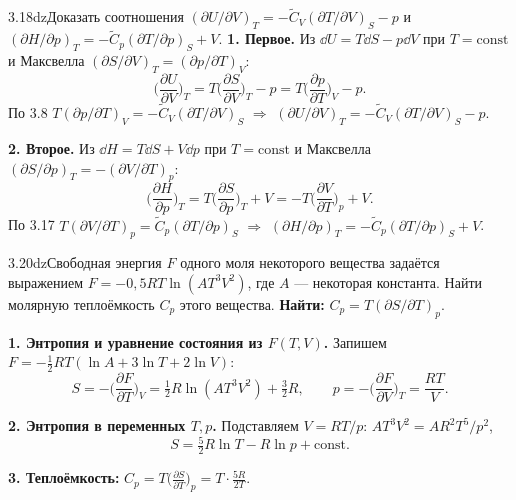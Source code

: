 \begin{problem}{3.18}{dz}{Доказать соотношения $(\partial U/\partial V)_T=-\widetilde C_V(\partial T/\partial V)_S-p$ и
$(\partial H/\partial p)_T=-\widetilde C_p(\partial T/\partial p)_S+V$.}
\textbf{1. Первое.} Из $\dd U=T\dd S-p\dd V$ при $T=\mathrm{const}$ и Максвелла $(\partial S/\partial V)_T=(\partial p/\partial T)_V$:
\[\Big(\frac{\partial U}{\partial V}\Big)_T=T\Big(\frac{\partial S}{\partial V}\Big)_T-p=T\Big(\frac{\partial p}{\partial T}\Big)_V-p.\]
По 3.8 $T(\partial p/\partial T)_V=-\widetilde C_V(\partial T/\partial V)_S$ $\Rightarrow$
$(\partial U/\partial V)_T=-\widetilde C_V(\partial T/\partial V)_S-p$.

\textbf{2. Второе.} Из $\dd H=T\dd S+V\dd p$ при $T=\mathrm{const}$ и Максвелла $(\partial S/\partial p)_T=-(\partial V/\partial T)_p$:
\[\Big(\frac{\partial H}{\partial p}\Big)_T=T\Big(\frac{\partial S}{\partial p}\Big)_T+V=-T\Big(\frac{\partial V}{\partial T}\Big)_p+V.\]
По 3.17 $T(\partial V/\partial T)_p=\widetilde C_p(\partial T/\partial p)_S$ $\Rightarrow$
$(\partial H/\partial p)_T=-\widetilde C_p(\partial T/\partial p)_S+V$.
\end{problem}

\begin{problem}{3.20}{dz}{Свободная энергия $F$ одного моля некоторого вещества задаётся выражением $F=-0{,}5RT\ln(AT^3V^2)$,
где $A$ — некоторая константа. Найти молярную теплоёмкость $C_p$ этого вещества.}
\textbf{Найти:} $C_p=T(\partial S/\partial T)_p$.

\textbf{1. Энтропия и уравнение состояния из $F(T,V)$.} Запишем $F=-\frac12RT(\ln A+3\ln T+2\ln V)$:
\[S=-\Big(\frac{\partial F}{\partial T}\Big)_V=\tfrac12R\ln(AT^3V^2)+\tfrac32R,\qquad
p=-\Big(\frac{\partial F}{\partial V}\Big)_T=\frac{RT}{V}.\]

\textbf{2. Энтропия в переменных $T,p$.} Подставляем $V=RT/p$: $AT^3V^2=AR^2T^5/p^2$,
\[S=\tfrac52R\ln T-R\ln p+\mathrm{const}.\]

\textbf{3. Теплоёмкость:} $C_p=T\big(\frac{\partial S}{\partial T}\big)_p=T\cdot\frac{5R}{2T}$.
\end{problem}
